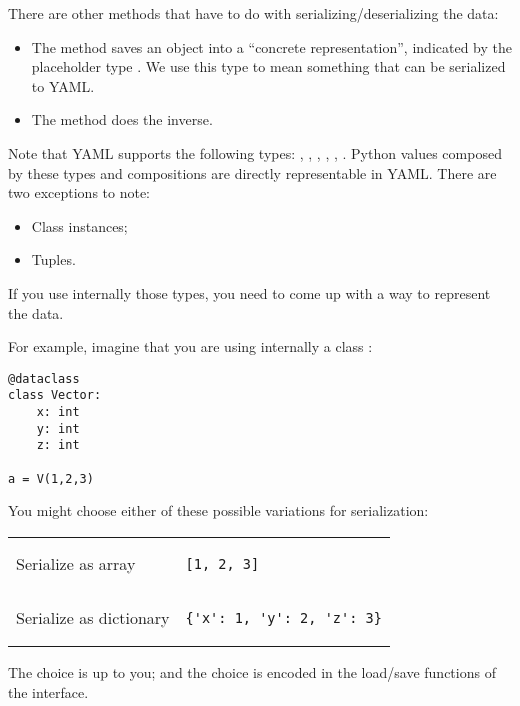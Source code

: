 There are other methods that have to do with serializing/deserializing the data:

\begin{itemize}
    \item The method  saves an object into a ``concrete representation'', indicated by the placeholder type \ConcreteRepr.
          We use this type to mean something that can be serialized to YAML.
    \item The method  does the inverse.
\end{itemize}

Note that YAML supports the following types: , , , , , .
Python values composed by these types and compositions are directly representable in YAML.
There are two exceptions to note:
\begin{itemize}
    \item Class instances;
    \item Tuples.
\end{itemize}
If you use internally those types, you need to come up with a way to represent the data.

For example, imagine that you are using internally a class :
%
\begin{verbatim}
@dataclass
class Vector:
    x: int
    y: int
    z: int

a = V(1,2,3)
\end{verbatim}

You might choose either of these possible variations for serialization:

\begin{tabular}{ll}
    Serialize as array      &
    \begin{minipage}{4cm}
        \begin{verbatim}
[1, 2, 3]
        \end{verbatim}
    \end{minipage} \\
    Serialize as dictionary &
    \begin{minipage}{4cm}
        \begin{verbatim}
{'x': 1, 'y': 2, 'z': 3}
        \end{verbatim}
    \end{minipage}
\end{tabular}

The choice is up to you; and the choice is encoded in the load/save functions of the \Setoid interface.

